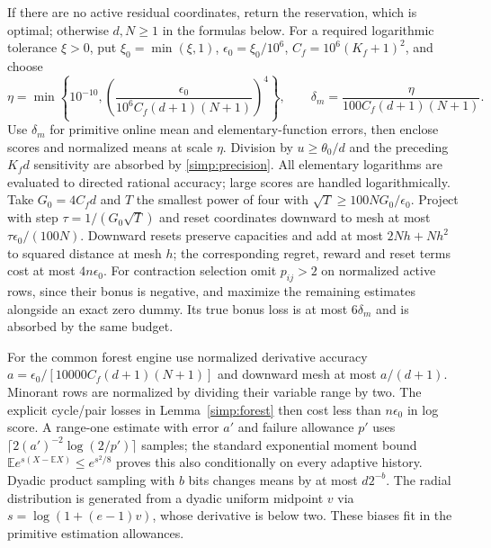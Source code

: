 If there are no active residual coordinates, return the reservation,
which is optimal; otherwise $d,N\ge1$ in the formulas below.
For a required logarithmic tolerance $\xi>0$, put
$\xi_0=\min(\xi,1)$, $\epsilon_0=\xi_0/10^6$,
$C_f=10^6(K_f+1)^2$, and choose
\begin{equation}\label{simp:precision}
 \eta=\min\left\{10^{-10},
       \left(\frac{\epsilon_0}{10^6C_f(d+1)(N+1)}\right)^4\right\},\qquad
 \delta_m=\frac{\eta}{100C_f(d+1)(N+1)}.
\end{equation}
Use $\delta_m$ for primitive online mean and elementary-function errors,
then enclose scores and normalized means at scale $\eta$.
Division by $u\ge\theta_0/d$ and the preceding $K_fd$ sensitivity are
absorbed by \eqref{simp:precision}. All elementary logarithms are evaluated
to directed rational accuracy; large scores are handled logarithmically.
Take $G_0=4C_fd$ and $T$ the smallest power of four with
$\sqrt T\ge100NG_0/\epsilon_0$. Project with step
$\tau=1/(G_0\sqrt T)$ and reset coordinates downward to mesh at most
$\tau\epsilon_0/(100N)$. Downward resets preserve capacities and add at
most $2Nh+Nh^2$ to squared distance at mesh $h$; the corresponding
regret, reward and reset terms cost at most $4n\epsilon_0$.
For contraction selection omit $p_{ij}>2$ on normalized active rows,
since their bonus is negative, and maximize the remaining estimates
alongside an exact zero dummy. Its true bonus loss is at most
$6\delta_m$ and is absorbed by the same budget.

For the common forest engine use normalized derivative accuracy
$a=\epsilon_0/[10000C_f(d+1)(N+1)]$ and downward mesh at most
$a/(d+1)$. Minorant rows are normalized by dividing their variable
range by two. The explicit cycle/pair losses in Lemma~\ref{simp:forest}
then cost less than $n\epsilon_0$ in log score. A range-one estimate
with error $a'$ and failure allowance $p'$ uses
$\lceil2(a')^{-2}\log(2/p')\rceil$ samples; the standard exponential
moment bound $\mathbb Ee^{s(X-\mathbb EX)}\le e^{s^2/8}$ proves this
also conditionally on every adaptive history.
Dyadic product sampling with $b$ bits changes means by at most $d2^{-b}$.
The radial distribution is generated from a dyadic uniform midpoint $v$
via $s=\log(1+(e-1)v)$, whose derivative is below two.
These biases fit in the primitive estimation allowances.

